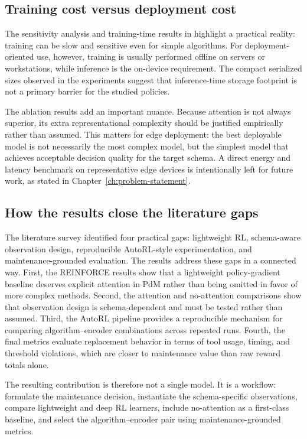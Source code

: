 \documentclass[12pt,oneside]{book}
\begin{document}
\subsection{Training cost versus deployment cost}
The sensitivity analysis and training-time results in \cite{Siraskar2025} highlight a practical reality: training can be slow and sensitive even for simple algorithms. For deployment-oriented use, however, training is usually performed offline on servers or workstations, while inference is the on-device requirement. The compact serialized sizes observed in the experiments suggest that inference-time storage footprint is not a primary barrier for the studied policies.

The ablation results add an important nuance. Because attention is not always superior, its extra representational complexity should be justified empirically rather than assumed. This matters for edge deployment: the best deployable model is not necessarily the most complex model, but the simplest model that achieves acceptable decision quality for the target schema. A direct energy and latency benchmark on representative edge devices is intentionally left for future work, as stated in Chapter~\ref{ch:problem-statement}.

\subsection{How the results close the literature gaps}
The literature survey identified four practical gaps: lightweight RL, schema-aware observation design, reproducible AutoRL-style experimentation, and maintenance-grounded evaluation. The results address these gaps in a connected way. First, the \textsc{REINFORCE} results show that a lightweight policy-gradient baseline deserves explicit attention in PdM rather than being omitted in favor of more complex methods. Second, the attention and no-attention comparisons show that observation design is schema-dependent and must be tested rather than assumed. Third, the AutoRL pipeline provides a reproducible mechanism for comparing algorithm--encoder combinations across repeated runs. Fourth, the final metrics evaluate replacement behavior in terms of tool usage, timing, and threshold violations, which are closer to maintenance value than raw reward totals alone.

The resulting contribution is therefore not a single model. It is a workflow: formulate the maintenance decision, instantiate the schema-specific observations, compare lightweight and deep RL learners, include no-attention as a first-class baseline, and select the algorithm--encoder pair using maintenance-grounded metrics.
\end{document}
